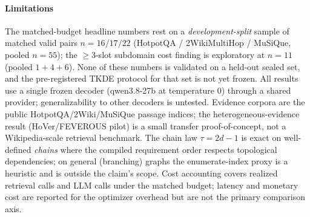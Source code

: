 \paragraph{Limitations}
The matched-budget headline numbers rest on a \emph{development-split} sample
of matched valid pairs $n=16/17/22$ (HotpotQA / 2WikiMultiHop / MuSiQue,
pooled $n=55$); the $\ge 3$-slot subdomain cost finding is exploratory at
$n=11$ (pooled $1{+}4{+}6$). None of these numbers is validated on a held-out
sealed set, and the pre-registered TKDE protocol for that set is not yet
frozen. All results use a single frozen decoder (qwen3.8-27b at temperature 0)
through a shared provider; generalizability to other decoders is untested.
Evidence corpora are
the public HotpotQA/2Wiki/MuSiQue passage indices; the heterogeneous-evidence
result (HoVer/FEVEROUS pilot) is a small transfer proof-of-concept, not a
Wikipedia-scale retrieval benchmark. The chain law $\tau = 2d - 1$ is exact on
well-defined \emph{chains} where the compiled requirement order respects
topological dependencies; on general (branching) graphs the enumerate-index
proxy is a heuristic and is outside the claim's scope. Cost accounting covers
realized retrieval calls and LLM calls under the matched budget; latency and
monetary cost are reported for the optimizer overhead but are not the primary
comparison axis.
